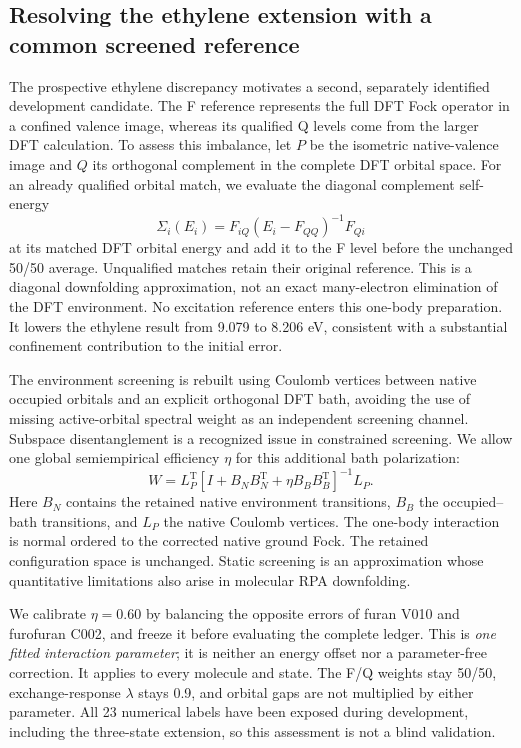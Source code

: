 \documentclass[11pt,a4paper]{article}
\begin{document}
\subsection{Resolving the ethylene extension with a common screened reference}
The prospective ethylene discrepancy motivates a second, separately
identified development candidate. The F reference represents the full DFT
Fock operator in a confined valence image, whereas its qualified Q levels
come from the larger DFT calculation. To assess this imbalance, let $P$
be the isometric native-valence image and $Q$ its orthogonal complement
in the complete DFT orbital space. For an already qualified orbital match,
we evaluate the diagonal complement self-energy
\begin{equation}
 \Sigma_i(E_i)=F_{iQ}(E_i-F_{QQ})^{-1}F_{Qi}
\end{equation}
at its matched DFT orbital energy and add it to the F level before the
unchanged 50/50 average. Unqualified matches retain their original reference.
This is a diagonal downfolding approximation, not an exact many-electron
elimination of the DFT environment. No excitation reference enters this
one-body preparation. It lowers the ethylene result from 9.079 to 8.206 eV,
consistent with a substantial confinement contribution to the initial error.

The environment screening is rebuilt using Coulomb vertices between native
occupied orbitals and an explicit orthogonal DFT bath, avoiding the use of
missing active-orbital spectral weight as an independent screening channel.
Subspace disentanglement is a recognized issue in constrained
screening.\cite{miyake2009} We allow one global semiempirical efficiency
$\eta$ for this additional bath polarization:
\begin{equation}
 W=L_P^\mathrm{T}
 \left[I+B_NB_N^\mathrm{T}+\eta B_BB_B^\mathrm{T}\right]^{-1}L_P .
\end{equation}
Here $B_N$ contains the retained native environment transitions, $B_B$
the occupied--bath transitions, and $L_P$ the native Coulomb vertices.
The one-body interaction is normal ordered to the corrected native ground
Fock. The retained configuration space is unchanged. Static screening is
an approximation whose quantitative limitations also arise in molecular
RPA downfolding.\cite{verzijl2026}

We calibrate $\eta=0.60$ by balancing the opposite errors of furan V010
and furofuran C002, and freeze it before evaluating the complete ledger.
This is \emph{one fitted interaction parameter}; it is neither an energy
offset nor a parameter-free correction. It applies to every molecule and
state. The F/Q weights stay 50/50, exchange-response $\lambda$ stays 0.9,
and orbital gaps are not multiplied by either parameter. All 23 numerical
labels have been exposed during development, including the three-state
extension, so this assessment is not a blind validation.
\end{document}

